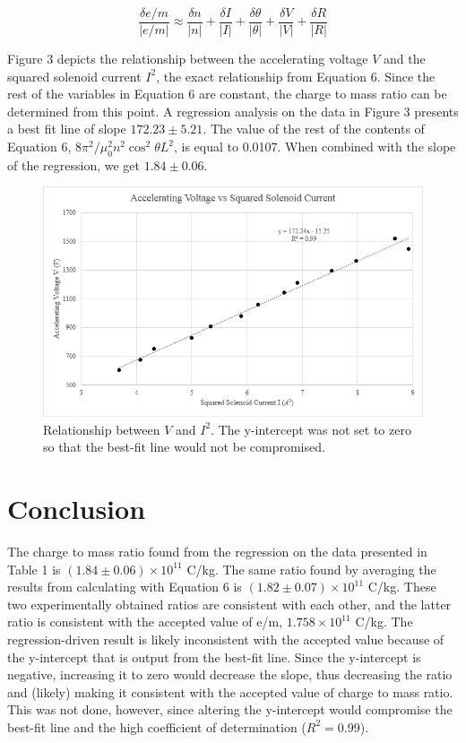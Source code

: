 \documentclass[%
 aip,
 amsmath,amssymb,
 reprint,%
floatfix,
]{revtex4-1}
\begin{document}
\begin{equation}
	\frac{\delta e/m}{\lvert e/m \rvert} \approx \frac{\delta n}{\lvert n \rvert} + \frac{\delta I}{\lvert I \rvert} + \frac{\delta \theta}{\lvert \theta \rvert} + \frac{\delta V}{\lvert V \rvert} + \frac{\delta R}{\lvert R \rvert}
\end{equation}


Figure 3 depicts the relationship between the accelerating voltage $V$ and the squared solenoid current $I^2$, the exact relationship from Equation 6. Since the rest of the variables in Equation 6 are constant, the charge to mass ratio can be determined from this point. A regression analysis on the data in Figure 3 presents a best fit line of slope $172.23 \pm 5.21$. The value of the rest of the contents of Equation 6, $8\pi^2/\mu_0^2n^2\cos^2{\theta}L^2$, is equal to 0.0107. When combined with the slope of the regression, we get $1.84 \pm 0.06$.

\begin{figure}[H]
	\centering
	\includegraphics[scale=0.9]{graph.png}
	\caption{Relationship between $V$ and $I^2$. The y-intercept was not set to zero so that the best-fit line would not be compromised.}
\end{figure}

\section{\label{sec:level5}Conclusion}

The charge to mass ratio found from the regression on the data presented in Table 1 is $(1.84 \pm 0.06) \times 10^{11}$ C/kg. The same ratio found by averaging the results from calculating with Equation 6 is $(1.82 \pm 0.07) \times 10^{11}$ C/kg. These two experimentally obtained ratios are consistent with each other, and the latter ratio is consistent with the accepted value of e/m, $1.758 \times 10^{11}$ C/kg. The regression-driven result is likely inconsistent with the accepted value because of the y-intercept that is output from the best-fit line. Since the y-intercept is negative, increasing it to zero would decrease the slope, thus decreasing the ratio and (likely) making it consistent with the accepted value of charge to mass ratio. This was not done, however, since altering the y-intercept would compromise the best-fit line and the high coefficient of determination ($R^2=0.99$). 
\end{document}
